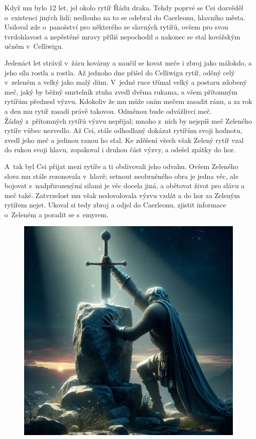 \documentclass[a4paper,twocolumn,openany,nodeprecatedcode, justified]{dndbook}
\begin{document}
	Když mu bylo 12 let, jel okolo rytíř Řádu draka. Tehdy poprvé se Cei dozvěděl o~existenci jiných lidí; nedlouho na to se odebral do Caerleonu, hlavního města. Usiloval zde o~panošství pro některého ze slavných rytířů, ovšem pro svou tvrdohlavost a nepěstěné mravy příliš nepochodil a nakonec se stal kovářským učněm v~Celliwigu.
	
	Jedenáct let strávil v~žáru kovárny a naučil se kovat meče i zbroj jako málokdo, a jeho síla rostla a rostla. Až jednoho dne přišel do Celliwigu rytíř, oděný celý v~zeleném a velký jako malý dům. V~jedné ruce třímal velký a postaru zdobený meč, jaký by běžný smrtelník ztuha zvedl dvěma rukama, a všem přítomným rytířům přednesl výzvu. Kdokoliv že mu může oním mečem zasadit ránu, a za rok a den mu rytíř zasadí právě takovou. Odměnou bude odvážlivci meč. \\
	
	Žádný z~přítomných rytířů výzvu nepřijal; mnoho z~nich by nejspíš meč Zeleného rytíře vůbec nezvedlo. Až Cei, stále odhodlaný dokázat rytířům svoji hodnotu, zvedl jeho meč a jedinou ranou ho sťal. Ke zděšení všech však Zelený rytíř vzal do rukou svoji hlavu, zopakoval i druhou část výzvy, a odešel zpátky do hor. 
	
	A~tak byl Cei přijat mezi rytíře a ti obdivovali jeho odvahu. Ovšem Zeleného slova mu stále rezonovala v~hlavě; setnout neobrněného obra je jedna věc, ale bojovat s~nadpřirozenými silami je věc docela jiná, a obětovat život pro slávu a meč také. Zatvrzelost mu však nedovolovala výzvu vzdát a do hor za Zeleným rytířem nejet. Ukoval si tedy zbroj a odjel do Caerleonu, zjistit informace o~Zeleném a poradit se s~emyrem.
	
	\begin{figure}[t]
		\centering
	\noindent
	\includegraphics[width=\linewidth]{SwordInStone.jpg}
	\end{figure}
	
\end{document}
